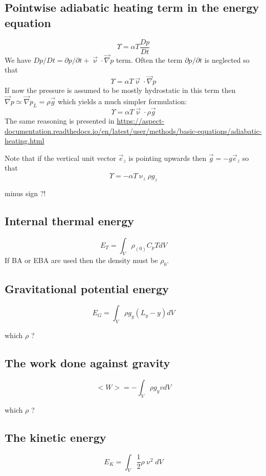 \documentclass[a4paper,11pt]{article}
\begin{document}
\subsection{Pointwise adiabatic heating term in the energy equation}

\[
\Upsilon=\alpha T \frac{Dp}{Dt}
\]
We have $Dp/Dt=\partial p/\partial t + \vec\upnu\cdot\vec\nabla p$ term. 
Often the term $\partial p/\partial t$ is neglected
so that 
\[
\Upsilon = \alpha T \vec\upnu\cdot\vec\nabla p 
\]
If now the pressure is assumed to be mostly hydrostatic in this term then
$\vec\nabla p \simeq \vec\nabla p_L = \rho \vec{g}$ which yields a much simpler formulation:
\[
\Upsilon = \alpha T \vec\upnu\cdot \rho \vec{g}
\]
The same reasoning is presented in 
\url{https://aspect-documentation.readthedocs.io/en/latest/user/methods/basic-equations/adiabatic-heating.html}

Note that if the vertical unit vector $\vec{e}_z$ is pointing upwards then $\vec{g}=-g \vec{e}_z$
so that 
\[
\Upsilon = -\alpha T \upnu_z \rho g_z
\]

{\color{red} minus sign ?!}


\subsection{Internal thermal energy}
\[
E_T = \int_V \rho_{(0)} C_p T dV
\]
If BA or EBA are used then the density must be $\rho_0$.


\subsection{Gravitational potential energy}
\[
E_G = \int_V \rho g_y (L_y-y) dV
\]

{\color{red} which $\rho$ ?}


\subsection{The work done against gravity}

\[
<W>=-\int_V \rho g_y v dV
\]

{\color{red} which $\rho$ ?}



\subsection{The kinetic energy}
\[
E_K=\int_V \frac{1}{2}\rho \upnu^2 dV
\]
\end{document}
